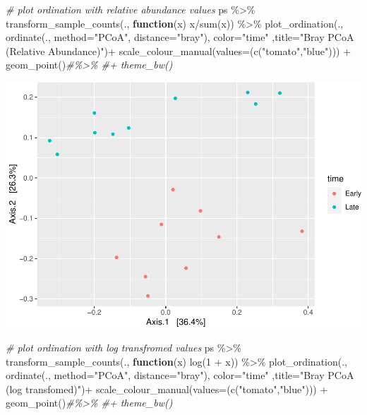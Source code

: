 \documentclass[
]{book}
\newenvironment{Shaded}{\begin{snugshade}}{\end{snugshade}}
\newcommand{\AttributeTok}[1]{\textcolor[rgb]{0.77,0.63,0.00}{#1}}
\newcommand{\CommentTok}[1]{\textcolor[rgb]{0.56,0.35,0.01}{\textit{#1}}}
\newcommand{\ControlFlowTok}[1]{\textcolor[rgb]{0.13,0.29,0.53}{\textbf{#1}}}
\newcommand{\DecValTok}[1]{\textcolor[rgb]{0.00,0.00,0.81}{#1}}
\newcommand{\FunctionTok}[1]{\textcolor[rgb]{0.00,0.00,0.00}{#1}}
\newcommand{\NormalTok}[1]{#1}
\newcommand{\SpecialCharTok}[1]{\textcolor[rgb]{0.00,0.00,0.00}{#1}}
\newcommand{\StringTok}[1]{\textcolor[rgb]{0.31,0.60,0.02}{#1}}
\begin{document}
\begin{Shaded}
\begin{Highlighting}[]
\CommentTok{\# plot ordination with relative abundance values}
\NormalTok{ps }\SpecialCharTok{\%\textgreater{}\%}
\FunctionTok{transform\_sample\_counts}\NormalTok{(., }\ControlFlowTok{function}\NormalTok{(x) x}\SpecialCharTok{/}\FunctionTok{sum}\NormalTok{(x)) }\SpecialCharTok{\%\textgreater{}\%}
\FunctionTok{plot\_ordination}\NormalTok{(., }\FunctionTok{ordinate}\NormalTok{(., }\AttributeTok{method=}\StringTok{"PCoA"}\NormalTok{, }\AttributeTok{distance=}\StringTok{"bray"}\NormalTok{),}
\AttributeTok{color=}\StringTok{"time"}\NormalTok{ ,}\AttributeTok{title=}\StringTok{"Bray PCoA (Relative Abundance)"}\NormalTok{)}\SpecialCharTok{+} \FunctionTok{scale\_colour\_manual}\NormalTok{(}\AttributeTok{values=}\NormalTok{(}\FunctionTok{c}\NormalTok{(}\StringTok{"tomato"}\NormalTok{,}\StringTok{"blue"}\NormalTok{))) }\SpecialCharTok{+} \FunctionTok{geom\_point}\NormalTok{()}\CommentTok{\#\%\textgreater{}\% \#+ theme\_bw()}
\end{Highlighting}
\end{Shaded}

\includegraphics{16sworkshop_files/figure-latex/unnamed-chunk-3-2.pdf}

\begin{Shaded}
\begin{Highlighting}[]
\CommentTok{\# plot ordination with log transfromed values}
\NormalTok{ps }\SpecialCharTok{\%\textgreater{}\%}
\FunctionTok{transform\_sample\_counts}\NormalTok{(., }\ControlFlowTok{function}\NormalTok{(x) }\FunctionTok{log}\NormalTok{(}\DecValTok{1} \SpecialCharTok{+}\NormalTok{ x)) }\SpecialCharTok{\%\textgreater{}\%}
\FunctionTok{plot\_ordination}\NormalTok{(., }\FunctionTok{ordinate}\NormalTok{(., }\AttributeTok{method=}\StringTok{"PCoA"}\NormalTok{, }\AttributeTok{distance=}\StringTok{"bray"}\NormalTok{),}
\AttributeTok{color=}\StringTok{"time"}\NormalTok{ ,}\AttributeTok{title=}\StringTok{"Bray PCoA (log transfomed)"}\NormalTok{)}\SpecialCharTok{+} \FunctionTok{scale\_colour\_manual}\NormalTok{(}\AttributeTok{values=}\NormalTok{(}\FunctionTok{c}\NormalTok{(}\StringTok{"tomato"}\NormalTok{,}\StringTok{"blue"}\NormalTok{))) }\SpecialCharTok{+} \FunctionTok{geom\_point}\NormalTok{()}\CommentTok{\#\%\textgreater{}\% \#+ theme\_bw()}
\end{Highlighting}
\end{Shaded}
\end{document}

